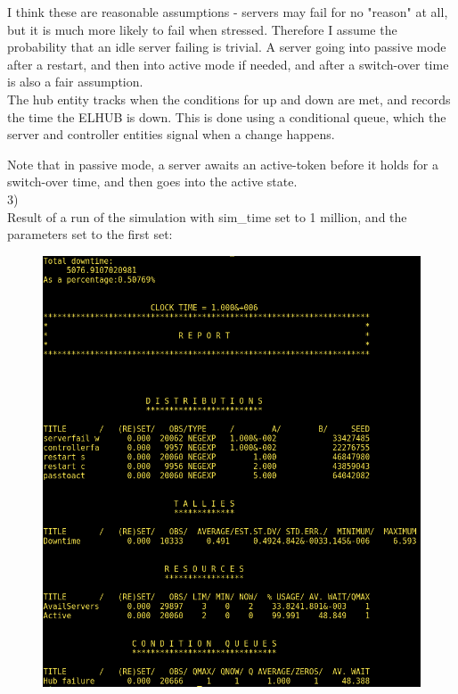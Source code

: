 \documentclass[11pt]{article}
\begin{document}
I think these are reasonable assumptions - servers may fail for no "reason" at all, but it is much more likely to fail when stressed. Therefore I assume the probability that an idle server failing is trivial. A server going into passive mode after a restart, and then into active mode if needed, and after a switch-over time is also a fair assumption.\\

The hub entity tracks when the conditions for up and down are met, and records the time the ELHUB is down. This is done using a conditional queue, which the server and controller entities signal when a change happens.

Note that in passive mode, a server awaits an active-token before it holds for a switch-over time, and then goes into the active state.\\

3)\\
Result of a run of the simulation with sim\_time set to 1 million, and the parameters set to the first set:

\begin{figure}[H]
	\includegraphics[width=\textwidth]{demos_2-2.png}
	\centering
\end{figure}
\end{document}

